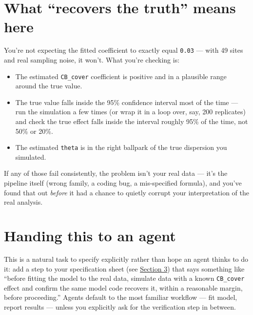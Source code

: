 \documentclass[
  letterpaper,
  DIV=11,
  numbers=noendperiod]{scrreprt}
\providecommand{\tightlist}{%
  \setlength{\itemsep}{0pt}\setlength{\parskip}{0pt}}
\begin{document}
\section{What ``recovers the truth'' means
here}\label{what-recovers-the-truth-means-here}

You're not expecting the fitted coefficient to exactly equal
\texttt{0.03} --- with 49 sites and real sampling noise, it won't. What
you're checking is:

\begin{itemize}
\tightlist
\item
  The estimated \texttt{CB\_cover} coefficient is positive and in a
  plausible range around the true value.
\item
  The true value falls inside the 95\% confidence interval most of the
  time --- run the simulation a few times (or wrap it in a loop over,
  say, 200 replicates) and check the true effect falls inside the
  interval roughly 95\% of the time, not 50\% or 20\%.
\item
  The estimated \texttt{theta} is in the right ballpark of the true
  dispersion you simulated.
\end{itemize}

If any of those fail consistently, the problem isn't your real data ---
it's the pipeline itself (wrong family, a coding bug, a mis-specified
formula), and you've found that out \emph{before} it had a chance to
quietly corrupt your interpretation of the real analysis.

\section{Handing this to an agent}\label{handing-this-to-an-agent}

This is a natural task to specify explicitly rather than hope an agent
thinks to do it: add a step to your specification sheet (see
\hyperref[specification-sheets]{Section 3}) that says something like
``before fitting the model to the real data, simulate data with a known
\texttt{CB\_cover} effect and confirm the same model code recovers it,
within a reasonable margin, before proceeding.'' Agents default to the
most familiar workflow --- fit model, report results --- unless you
explicitly ask for the verification step in between.
\end{document}
